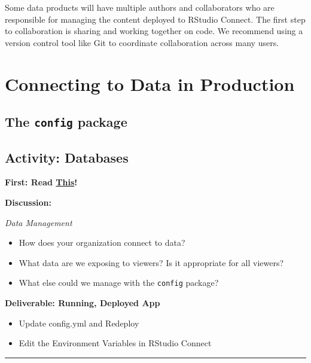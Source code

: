 \documentclass[]{book}
\providecommand{\tightlist}{%
  \setlength{\itemsep}{0pt}\setlength{\parskip}{0pt}}
\theoremstyle{definition}
\theoremstyle{definition}
\theoremstyle{definition}
\theoremstyle{remark}
\begin{document}
Some data products will have multiple authors and collaborators who are
responsible for managing the content deployed to RStudio Connect. The
first step to collaboration is sharing and working together on code. We
recommend using a version control tool like Git to coordinate
collaboration across many users.

\hypertarget{connecting-to-data-in-production}{%
\chapter{Connecting to Data in
Production}\label{connecting-to-data-in-production}}

\hypertarget{the-config-package}{%
\section{\texorpdfstring{The \texttt{config}
package}{The config package}}\label{the-config-package}}

\hypertarget{activity-databases}{%
\section{Activity: Databases}\label{activity-databases}}

\textbf{First: Read
\href{https://db.rstudio.com/best-practices/portable-code/}{This}!}

\textbf{Discussion:}

\emph{Data Management}

\begin{itemize}
\tightlist
\item
  How does your organization connect to data?
\item
  What data are we exposing to viewers? Is it appropriate for all
  viewers?
\item
  What else could we manage with the \texttt{config} package?
\end{itemize}

\textbf{Deliverable: Running, Deployed App}

\begin{itemize}
\tightlist
\item
  Update config.yml and Redeploy
\item
  Edit the Environment Variables in RStudio Connect
\end{itemize}

\begin{center}\rule{0.5\linewidth}{\linethickness}\end{center}
\end{document}
